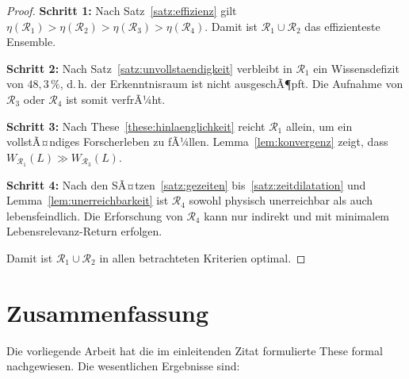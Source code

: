 ﻿\documentclass[a4paper,12pt]{article}
\theoremstyle{definition}
\begin{document}
\begin{proof}
    \textbf{Schritt 1:} Nach Satz~\ref{satz:effizienz} gilt
    $\eta(\mathcal{R}_1) > \eta(\mathcal{R}_2) > \eta(\mathcal{R}_3) > \eta(\mathcal{R}_4)$.
    Damit ist $\mathcal{R}_1 \cup \mathcal{R}_2$ das effizienteste Ensemble.

    \textbf{Schritt 2:} Nach Satz~\ref{satz:unvollstaendigkeit} verbleibt
    in $\mathcal{R}_1$ ein Wissensdefizit von $48{,}3\,\%$, d.\,h. der
    Erkenntnisraum ist nicht ausgeschÃ¶pft. Die Aufnahme von $\mathcal{R}_3$
    oder $\mathcal{R}_4$ ist somit verfrÃ¼ht.

    \textbf{Schritt 3:} Nach These~\ref{these:hinlaenglichkeit} reicht
    $\mathcal{R}_1$ allein, um ein vollstÃ¤ndiges Forscherleben zu fÃ¼llen.
    Lemma~\ref{lem:konvergenz} zeigt, dass $W_{\mathcal{R}_1}(L) \gg
    W_{\mathcal{R}_3}(L)$.

    \textbf{Schritt 4:} Nach den SÃ¤tzen~\ref{satz:gezeiten}
    bis~\ref{satz:zeitdilatation} und Lemma~\ref{lem:unerreichbarkeit}
    ist $\mathcal{R}_4$ sowohl physisch unerreichbar als auch lebensfeindlich.
    Die Erforschung von $\mathcal{R}_4$ kann nur indirekt und mit
    minimalem Lebensrelevanz-Return erfolgen.

    Damit ist $\mathcal{R}_1 \cup \mathcal{R}_2$ in allen betrachteten
    Kriterien optimal. \qedhere
\end{proof}

\section{Zusammenfassung}

Die vorliegende Arbeit hat die im einleitenden Zitat formulierte These formal
nachgewiesen. Die wesentlichen Ergebnisse sind:
\end{document}
